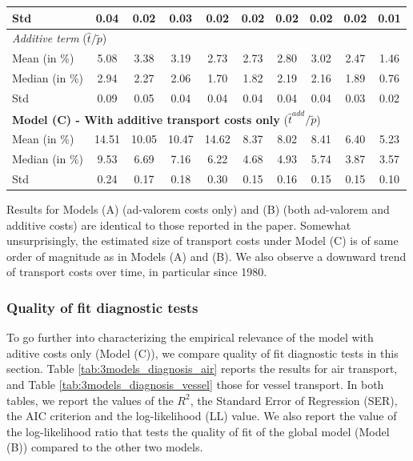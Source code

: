\documentclass[11pt,twoside, authoryear]{elsarticle}
\begin{document}
\begin{table}[htbp]
{\begin{tabular}{l|c c c c c c c c c}
    Std & 0.04  & 0.02  & 0.03  & 0.02  & 0.02  & 0.02  & 0.02  & 0.02  & 0.01 \\ \hline
       \multicolumn{10}{l}{\textit{Additive term} ($\widehat{t}/\widetilde{p}$)}  \\ \hline
    Mean (in \%)  & 5.08  & 3.38  & 3.19  & 2.73  & 2.73  & 2.80  & 3.02  & 2.47  & 1.46 \\
    Median (in \%) & 2.94  & 2.27  & 2.06  & 1.70  & 1.82  & 2.19  & 2.16  & 1.89  & 0.76 \\
    Std & 0.09  & 0.05  & 0.04  & 0.04  & 0.04  & 0.04  & 0.04  & 0.03  & 0.02 \\ \hline
    \multicolumn{10}{l}{\textbf{Model (C) - With additive transport costs only} ($\widehat{t}^{add}/\widetilde{p}$)} \\ \hline
    Mean (in \%) & 14.51 & 10.05 & 10.47 & 14.62 & 8.37  & 8.02  & 8.41  & 6.40  & 5.23 \\
    Median (in \%)& 9.53  & 6.69  & 7.16  & 6.22  & 4.68  & 4.93  & 5.74  & 3.87  & 3.57 \\
    Std & 0.24  & 0.17  & 0.18  & 0.30  & 0.15  & 0.16  & 0.15  & 0.15  & 0.10 \\ \hline \hline
   \end{tabular}%
   }
\end{table}%

Results for Models (A) (ad-valorem costs only) and (B) (both ad-valorem and additive costs) are identical to those reported in the paper. Somewhat unsurprisingly, the estimated size of transport costs under Model (C) is of same order of magnitude as in Models (A) and (B). We also observe a downward trend of transport costs over time, in particular since 1980.\\



\subsubsection{Quality of fit diagnostic tests}

To go further into characterizing the empirical relevance of the model with aditive costs only (Model (C)), we compare quality of fit diagnostic tests in this section. Table \ref{tab:3models_diagnosis_air} reports the results for air transport, and Table \ref{tab:3models_diagnosis_vessel} those for vessel transport. In both tables, we report the values of the $R^2$, the Standard Error of Regression (SER), the AIC criterion  and the log-likelihood (LL) value. We also report the value of the log-likelihood ratio that tests the quality of fit of the global model (Model (B)) compared to the other two models.
\end{document}
